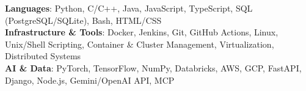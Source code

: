 \begin{itemize}[leftmargin=0.15in, label={}]
    \small{\item{
     \textbf{Languages}{: Python, C/C++, Java, JavaScript, TypeScript, SQL (PostgreSQL/SQLite), Bash, HTML/CSS} \\
     \textbf{Infrastructure \& Tools}{: Docker, Jenkins, Git, GitHub Actions, Linux, Unix/Shell Scripting, Container \& Cluster Management, Virtualization, Distributed Systems} \\
     \textbf{AI \& Data}{: PyTorch, TensorFlow, NumPy, Databricks, AWS, GCP, FastAPI, Django, Node.js, Gemini/OpenAI API, MCP}
    }}
\end{itemize}
